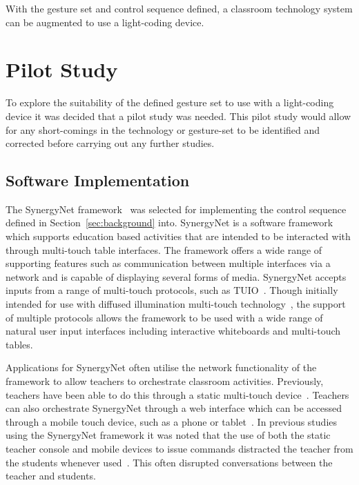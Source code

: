 \documentclass[link]{IWCOMP}
\begin{document}
With the gesture set and control sequence defined, a classroom technology system can be augmented to use a light-coding device.

\section{Pilot Study}
\label{sec:pilotStudy}

To explore the suitability of the defined gesture set to use with a light-coding device it was decided that a pilot study was needed.
This pilot study would allow for any short-comings in the technology or gesture-set to be identified and corrected before carrying out any further studies.

\subsection{Software Implementation}
\label{subsec:pilotStudyImplementation}

The SynergyNet framework~\citep{Higgins2011} was selected for implementing the control sequence defined in Section~\ref{sec:background} into.
SynergyNet is a software framework which supports education based activities that are intended to be interacted with through multi-touch table interfaces.
The framework offers a wide range of supporting features such as communication between multiple interfaces via a network and is capable of displaying several forms of media.
SynergyNet accepts inputs from a range of multi-touch protocols, such as TUIO~\citep{Kaltenbrunner2009}.
Though initially intended for use with diffused illumination multi-touch technology~\citep{Matsushita1997}, the support of multiple protocols allows the framework to be used with a wide range of natural user input interfaces including interactive whiteboards and multi-touch tables.

Applications for SynergyNet often utilise the network functionality of the framework to allow teachers to orchestrate classroom activities.
Previously, teachers have been able to do this through a static multi-touch device~\citep{AlAgha2010}.
Teachers can also orchestrate SynergyNet through a web interface which can be accessed through a mobile touch device, such as a phone or tablet~\citep{Mercier2013}.
In previous studies using the SynergyNet framework it was noted that the use of both the static teacher console and mobile devices to issue commands distracted the teacher from the students whenever used~\citep{Hatch2011,Mercier2013}.
This often disrupted conversations between the teacher and students.
\end{document}
